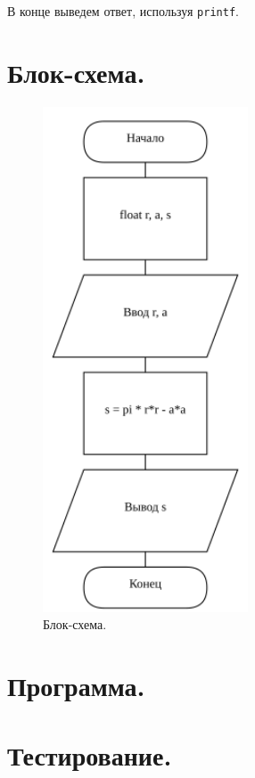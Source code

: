 В конце выведем ответ, используя \texttt{printf}.

\section{Блок-схема.}

\begin{figure}[h] %
    \centering %
    \includegraphics[height=15cm]{scheme} 
    \caption{Блок-схема.} %
    \label{fig:scheme} %
\end{figure}


\section{Программа.}

% 


\section{Тестирование.}

